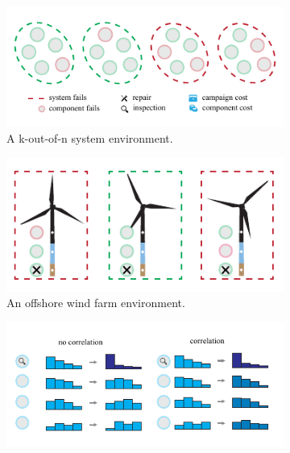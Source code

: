 \begin{figure}
\begin{subfigure}[t]{0.53\textwidth}
\centering
    \includegraphics[width=1\linewidth]{tex_thesis/figures/ch5/fig2_mul/environments_v2_a.pdf}
    \caption{A k-out-of-n system environment.}
    \label{fig:env_categories_1}
\end{subfigure}%
\begin{subfigure}[t]{0.47\textwidth}
\centering
    \includegraphics[width=1\linewidth]{tex_thesis/figures/ch5/fig2_mul/environments_v2_b.pdf}
    \caption{An offshore wind farm environment.}
    \label{fig:env_categories_2}
\end{subfigure}
%
\begin{subfigure}[t]{0.53\textwidth}
\centering
    \includegraphics[width=1\linewidth]{tex_thesis/figures/ch5/fig2_mul/environments_v2_c.pdf}

\end{subfigure}
\end{figure}
